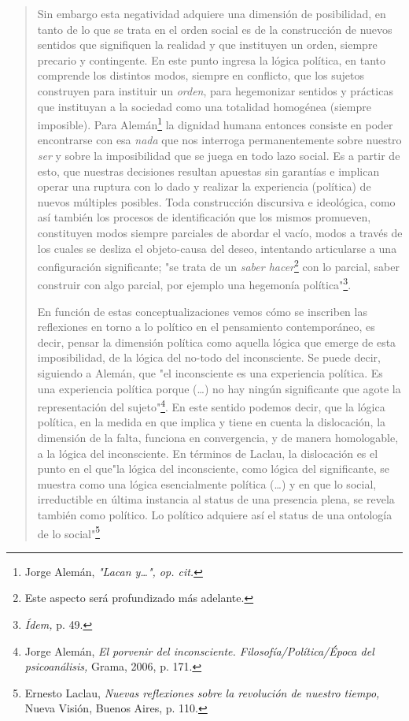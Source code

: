 \begin{quote}
Sin embargo esta negatividad adquiere una dimensión de posibilidad, en
tanto de lo que se trata en el orden social es de la construcción de
nuevos sentidos que signifiquen la realidad y que instituyen un orden,
siempre precario y contingente. En este punto ingresa la lógica
política, en tanto comprende los distintos modos, siempre en conflicto,
que los sujetos construyen para instituir un \emph{orden}, para
hegemonizar sentidos y prácticas que instituyan a la sociedad como una
totalidad homogénea (siempre imposible). Para Alemán\footnote{Jorge
  Alemán, \emph{"Lacan y\ldots", op. cit.}} la dignidad humana entonces
consiste en poder encontrarse con esa \emph{nada} que nos interroga
permanentemente sobre nuestro \emph{ser} y sobre la imposibilidad que se
juega en todo lazo social. Es a partir de esto, que nuestras decisiones
resultan apuestas sin garantías e implican operar una ruptura con lo
dado y realizar la experiencia (política) de nuevos múltiples posibles.
Toda construcción discursiva e ideológica, como así también los procesos
de identificación que los mismos promueven, constituyen modos siempre
parciales de abordar el vacío, modos a través de los cuales se desliza
el objeto-causa del deseo, intentando articularse a una configuración
significante; "se trata de un \emph{saber hacer}\footnote{Este aspecto
  será profundizado más adelante.} con lo parcial, saber construir con
algo parcial, por ejemplo una hegemonía política"\footnote{\emph{Ídem,}
  p. 49.}.

En función de estas conceptualizaciones vemos cómo se inscriben las
reflexiones en torno a lo político en el pensamiento contemporáneo, es
decir, pensar la dimensión política como aquella lógica que emerge de
esta imposibilidad, de la lógica del no-todo del inconsciente. Se puede
decir, siguiendo a Alemán, que "el inconsciente es una experiencia
política. Es una experiencia política porque (\dots) no hay ningún
significante que agote la representación del sujeto"\footnote{Jorge
  Alemán, \emph{El porvenir del inconsciente. Filosofía/Política/Época
  del psicoanálisis,} Grama, 2006, p. 171.}. En este sentido podemos
decir, que la lógica política, en la medida en que implica y tiene en
cuenta la dislocación, la dimensión de la falta, funciona en
convergencia, y de manera homologable, a la lógica del inconsciente. En
términos de Laclau, la dislocación es el punto en el que"la lógica del
inconsciente, como lógica del significante, se muestra como una lógica
esencialmente política (\dots) y en que lo social, irreductible en
última instancia al status de una presencia plena, se revela también
como político. Lo político adquiere así el status de una ontología de lo
social"\footnote{Ernesto Laclau, \emph{Nuevas reflexiones sobre la
  revolución de nuestro tiempo,} Nueva Visión, Buenos Aires, p. 110.}
\end{quote}

